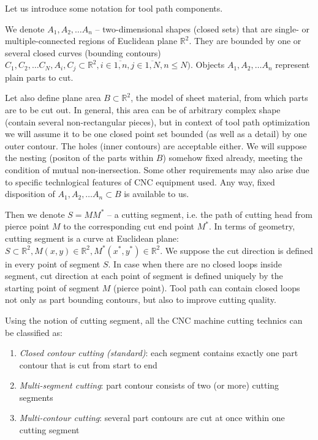 \documentclass{../download/tPRS2e}
\begin{document}
Let us introduce some notation for tool path components.

We denote $A_1, A_2, \dots A_n$ -- two-dimensional shapes
(closed sets)
that are single- or multiple-connected
regions of Euclidean plane
$\mathbb R^2$.
They are bounded by one or several closed curves
(bounding contours)
$C_1, C_2, \dots C_N,
A_i, C_j \subset \mathbb R^2,
i \in \overline{1, n},
j \in \overline{1, N},
n \leqslant N)$.
Objects $A_1, A_2, \dots A_n$
represent plain parts to cut.

Let also define plane area
$B \subset \mathbb R^2$,
the model of 
sheet material, from which parts are to be cut out.
In general,
this area can be of arbitrary complex shape
(contain several non-rectangular pieces),
but in context of tool path optimization
we will assume it to be
one closed point set bounded
(as well as a detail) by one outer contour.
The holes
(inner contours) are acceptable either.
We will suppose the nesting
(positon of the parts within $B$)
somehow fixed already,
meeting the condition of
mutual non-inersection.
Some other requirements may also arise
due to specific technlogical features
of CNC equipment used.
Any way,
fixed disposition of
$A_1, A_2, \dots A_n \subset B$
is available to us.

Then we denote $S=MM^*$ -- a cutting segment,
i.e. the path of cutting head
from pierce point $M$
to the corresponding cut end point $M^*$.
In terms of geometry,
cutting segment is a curve at Euclidean plane:
$S \subset \mathbb R^2,
M(x,y) \in \mathbb R^2,
M^*(x^*,y^*) \in \mathbb R^2$.
We suppose
the cut direction is defined
in every point of segment $S$.
In case when there are no
closed loops inside segment,
cut direction at each point of segment
is defined uniquely by the starting
point of segment $M$
(pierce point).
Tool path can contain closed loops
not only as part bounding contours,
but also to improve cutting quality.

Using the notion of cutting segment,
all the CNC machine cutting technics
can be classified as:
\begin{enumerate}
    \item{\textit{Closed contour cutting (standard)}}:
    each segment contains exactly one part contour
    that is cut from start to end
    \item{\textit{Multi-segment cutting}}:
    part contour consists of two (or more) cutting segments
    \item{\textit{Multi-contour cutting}}:
    several part contours are cut at once within one cutting segment
\end{enumerate}
\end{document}
